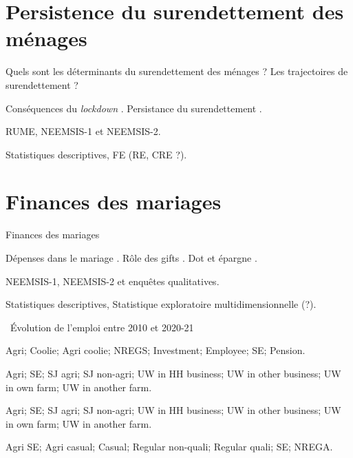 \documentclass[aspectratio=169]{beamer}
\begin{document}
\section{Persistence du surendettement des ménages}
\begin{frame}{Quels sont les déterminants du surendettement des ménages ? Les trajectoires de surendettement ?}
    \begin{vfilleditems}
        \item[\faBook] Conséquences du \textit{lockdown} \citep{Guerin2021}. Persistance du surendettement \citep{Chichaibelu2018}.
        \item[\faDatabase] RUME, NEEMSIS-1 et NEEMSIS-2.
		\item[\faIndustry] Statistiques descriptives, FE (RE, CRE ?).
    \end{vfilleditems}
\end{frame}







\section{Finances des mariages}
\begin{frame}{Finances des mariages}
    \begin{vfilleditems}
        \item[\faBook] Dépenses dans le mariage \citep{Bloch2004}. Rôle des gifts \citep{Guerin2020c}. Dot et épargne \citep{Anukriti2020}.
        \item[\faDatabase] NEEMSIS-1, NEEMSIS-2 et enquêtes qualitatives.
		\item[\faIndustry] Statistiques descriptives, Statistique exploratoire multidimensionnelle (?). 
    \end{vfilleditems}
\end{frame}






\begin{frame}{\faCommentsO ~Évolution de l'emploi entre 2010 et 2020-21}
    \begin{vfilleditems}
        \item[2010] Agri; Coolie; Agri coolie; NREGS; Investment; Employee; SE; Pension.
        \item[2016] Agri; SE; SJ agri; SJ non-agri; UW in HH business; UW in other business; UW in own farm; UW in another farm.
        \item[2020] Agri; SE; SJ agri; SJ non-agri; UW in HH business; UW in other business; UW in own farm; UW in another farm.
        \item[Panel] Agri SE; Agri casual; Casual; Regular non-quali; Regular quali; SE; NREGA.
    \end{vfilleditems}
\end{frame}
\end{document}
